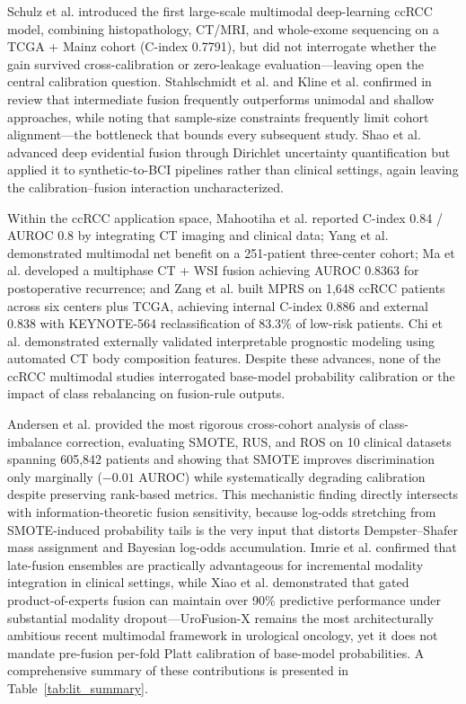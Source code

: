 Schulz et al. \cite{schulz2021multimodal} introduced the first large-scale multimodal deep-learning ccRCC model, combining histopathology, CT/MRI, and whole-exome sequencing on a TCGA + Mainz cohort (C-index 0.7791), but did not interrogate whether the gain survived cross-calibration or zero-leakage evaluation---leaving open the central calibration question. Stahlschmidt et al. \cite{stahlschmidt2021multimodal} and Kline et al. \cite{kline2022multimodal} confirmed in review that intermediate fusion frequently outperforms unimodal and shallow approaches, while noting that sample-size constraints frequently limit cohort alignment---the bottleneck that bounds every subsequent study. Shao et al. \cite{shao2023deep} advanced deep evidential fusion through Dirichlet uncertainty quantification but applied it to synthetic-to-BCI pipelines rather than clinical settings, again leaving the calibration--fusion interaction uncharacterized.

Within the ccRCC application space, Mahootiha et al. \cite{mahootiha2023multimodal} reported C-index 0.84 / AUROC 0.8 by integrating CT imaging and clinical data; Yang et al. \cite{yang2024multimodal} demonstrated multimodal net benefit on a 251-patient three-center cohort; Ma et al. \cite{ma2025genomic} developed a multiphase CT + WSI fusion achieving AUROC 0.8363 for postoperative recurrence; and Zang et al. \cite{zang2025multimodal} built MPRS on 1,648 ccRCC patients across six centers plus TCGA, achieving internal C-index 0.886 and external 0.838 with KEYNOTE-564 reclassification of 83.3\% of low-risk patients. Chi et al. \cite{chi2026multimodal} demonstrated externally validated interpretable prognostic modeling using automated CT body composition features. Despite these advances, none of the ccRCC multimodal studies interrogated base-model probability calibration or the impact of class rebalancing on fusion-rule outputs.

Andersen et al. \cite{andersen2024impact} provided the most rigorous cross-cohort analysis of class-imbalance correction, evaluating SMOTE, RUS, and ROS on 10 clinical datasets spanning 605,842 patients and showing that SMOTE improves discrimination only marginally ($-0.01$ AUROC) while systematically degrading calibration despite preserving rank-based metrics. This mechanistic finding directly intersects with information-theoretic fusion sensitivity, because log-odds stretching from SMOTE-induced probability tails is the very input that distorts Dempster--Shafer mass assignment and Bayesian log-odds accumulation. Imrie et al. \cite{imrie2025automated} confirmed that late-fusion ensembles are practically advantageous for incremental modality integration in clinical settings, while Xiao et al. \cite{xiao2026urofusion} demonstrated that gated product-of-experts fusion can maintain over 90\% predictive performance under substantial modality dropout---UroFusion-X remains the most architecturally ambitious recent multimodal framework in urological oncology, yet it does not mandate pre-fusion per-fold Platt calibration of base-model probabilities. A comprehensive summary of these contributions is presented in Table~\ref{tab:lit_summary}.

